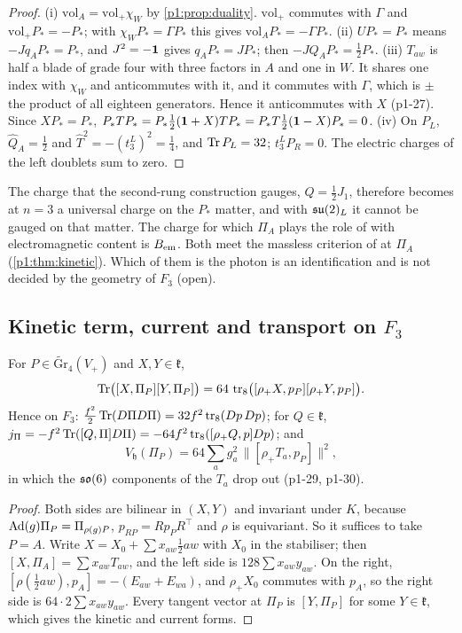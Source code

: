 \begin{proof}
(i) $\mathrm{vol}_A=\mathrm{vol}_+\chi_W$ by \cref{p1:prop:duality}. $\mathrm{vol}_+$ commutes with $\Gamma$ and $\mathrm{vol}_+P_*=-P_*$; with $\chi_WP_*=\Gamma P_*$
\cite[Thm.~8.1]{ES17} this gives $\mathrm{vol}_AP_*=-\Gamma P_*$. (ii) $UP_*=P_*$ means $-Jq_AP_*=P_*$, and $J^2=-\mathbf 1$ gives $q_AP_*=JP_*$; then $-JQ_AP_*=\tfrac12P_*$. (iii)
$T_{aw}$ is half a blade of grade four with three factors in $A$ and one in $W$. It shares one index with $\chi_W$ and anticommutes with it, and it commutes with $\Gamma$,
which is $\pm$ the product of all eighteen generators. Hence it anticommutes with $X$ (p1-27).
Since $XP_*=P_*$, $P_*TP_*=P_*\tfrac12(\mathbf 1+X)TP_*=P_*T\tfrac12(\mathbf 1-X)P_*=0$. (iv) On $P_L$, $\hat Q_A=\tfrac12$ and $\hat T^2=-(t^L_3)^2=\tfrac14$, and $\operatorname{Tr} P_L=32$; $t^L_3P_R=0$. The electric charges of the left doublets sum to zero.
\end{proof}

The charge that the second-rung construction gauges, $Q=\tfrac12J_1$, therefore becomes at $n=3$ a universal charge on the
$P_*$ matter, and with $\mathfrak{su}(2)_L$ it cannot be gauged on that matter. The charge for which $\Pi_A$ plays the role of \cite[Def.~26.5]{ES17} with electromagnetic content is
$B_{\rm em}$. Both meet the massless criterion of \cite[Cor.~26.2]{ES17} at $\Pi_A$ (\cref{p1:thm:kinetic}). Which of them is the photon is an identification and is
not decided by the geometry of $F_3$ (open).

\subsection{Kinetic term, current and transport on \texorpdfstring{$F_3$}{F\_3}}
\label{p1:sec:kinetic}

\begin{lemma}
\label{p1:lem:vector}
For $P\in\widetilde{\mathrm{Gr}}_4(V_+)$ and $X,Y\in\mathfrak k$,
\[
\operatorname{Tr}\bigl([X,\Pi_P][Y,\Pi_P]\bigr)=64\,\operatorname{tr}_8\bigl([\rho_+X,p_P][\rho_+Y,p_P]\bigr).
\]
Hence on $F_3$: $\tfrac{f^2}2\operatorname{Tr}(D\Pi D\Pi)=32f^2\operatorname{tr}_8(Dp\,Dp)$; for $Q\in\mathfrak k$, $j_\Pi=-f^2\operatorname{Tr}([Q,\Pi]D\Pi)=-64f^2\operatorname{tr}_8([\rho_+Q,p]Dp)$; and
\[
V_{\mathfrak h}(\Pi_P)=64\sum_ag_a^2\,\|[\rho_+T_a,p_P]\|^2 ,
\]
in which the $\mathfrak{so}(6)$ components of the $T_a$ drop out (p1-29, p1-30).
\end{lemma}

\begin{proof}
Both sides are bilinear in $(X,Y)$ and invariant under $K$, because $\operatorname{Ad}(g)\Pi_P=\Pi_{\rho(g)P}$, $p_{RP}=Rp_PR^{\!\top}$ and $\rho$ is equivariant. So it suffices to take
$P=A$. Write $X=X_0+\sum x_{aw}\tfrac12aw$ with $X_0$ in the stabiliser; then $[X,\Pi_A]=\sum x_{aw}T_{aw}$, and the left side is $128\sum x_{aw}y_{aw}$. On the right,
$[\rho(\tfrac12aw),p_A]=-(E_{aw}+E_{wa})$, and $\rho_+X_0$ commutes with $p_A$, so the right side is $64\cdot2\sum x_{aw}y_{aw}$. Every tangent vector at $\Pi_P$ is $[Y,\Pi_P]$ for
some $Y\in\mathfrak k$, which gives the kinetic and current forms.
\end{proof}


